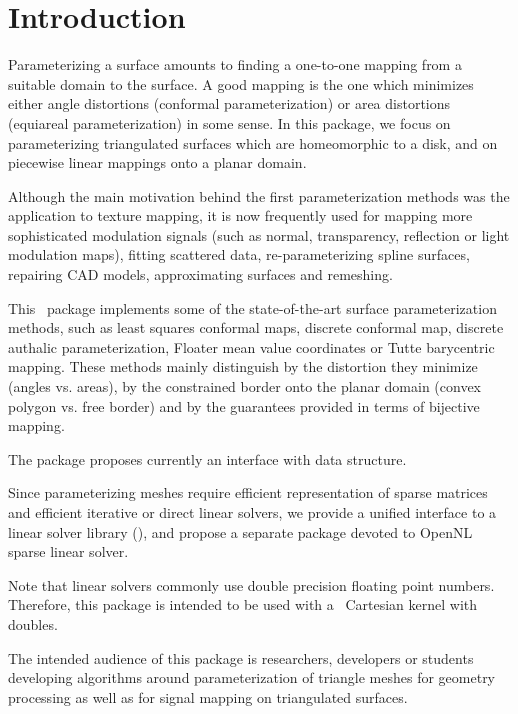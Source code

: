 \section{Introduction}

Parameterizing a surface amounts to finding a one-to-one mapping from
a suitable domain to the surface. A good mapping is the one which
minimizes either angle distortions (conformal parameterization) or
area distortions (equiareal parameterization) in some sense.  In this
package, we focus on parameterizing triangulated surfaces which are
homeomorphic to a disk, and on piecewise linear mappings onto a planar
domain.

Although the main motivation behind the first parameterization methods
was the application to texture mapping, it is now frequently used for
mapping more sophisticated modulation signals (such as normal,
transparency, reflection or light modulation maps), fitting scattered
data, re-parameterizing spline surfaces, repairing CAD models,
approximating surfaces and remeshing.

This \cgal\ package implements some of the state-of-the-art
surface parameterization methods, such as least squares conformal maps,
discrete conformal map, discrete authalic
parameterization, Floater mean value coordinates or Tutte barycentric
mapping. These methods mainly distinguish by the distortion they
minimize (angles vs. areas), by the constrained border onto the
planar domain (convex polygon vs. free border) and by the guarantees
provided in terms of bijective mapping.

The package proposes currently an interface with 
data structure.

Since parameterizing meshes require efficient representation of sparse
matrices and efficient iterative or direct linear solvers, we provide
a unified interface to a linear solver library (\eigen),
and propose a separate package devoted to OpenNL sparse
linear solver.

Note that linear solvers commonly use double precision floating point
numbers. Therefore, this package is intended to be used with a \cgal\
Cartesian kernel with doubles.

The intended audience of this package is researchers, developers or
students developing algorithms around parameterization of triangle
meshes for geometry processing as well as for signal mapping on
triangulated surfaces.

